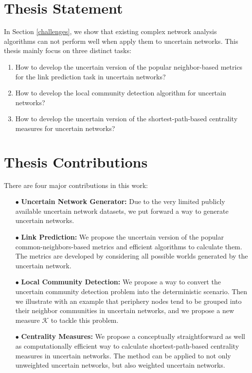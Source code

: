 \documentclass[\main/thesis.tex]{subfiles}
\begin{document}
\section{Thesis Statement}
In Section \ref{challenges}, we show that existing complex network analysis algorithms can not perform well when apply them to uncertain networks. This thesis mainly focus on three distinct tasks:
\begin{enumerate}
\item How to develop the uncertain version of the popular neighbor-based metrics for the link prediction task in uncertain networks?
\item How to develop the local community detection algorithm for uncertain networks?
\item How to develop the uncertain version of the shortest-path-based centrality measures for uncertain networks?
\end{enumerate}

\section{Thesis Contributions}
There are four major contributions in this work:
\begin{enumerate}
\item[$\bullet$] \textbf{Uncertain Network Generator:}  Due to the very limited publicly available uncertain network datasets, we put forward a way to generate uncertain networks.
\item[$\bullet$] \textbf{Link Prediction:}  We propose the uncertain version of the popular common-neighbors-based metrics and efficient algorithms to calculate them. The metrics are developed by considering all possible worlds generated by the uncertain network.
\item[$\bullet$] \textbf{Local Community Detection:} We propose a way to convert the uncertain community detection problem into the deterministic scenario. Then we illustrate with an example that periphery nodes tend to be grouped into their neighbor communities in uncertain networks, and we propose a new measure $\mathcal{K}$ to tackle this problem.
\item[$\bullet$] \textbf{Centrality Measures:}  We propose a conceptually straightforward as well as computationally efficient way to calculate shortest-path-based centrality measures in uncertain networks. The method can be applied to not only unweighted uncertain networks, but also weighted uncertain networks.

\end{enumerate}
\end{document}
